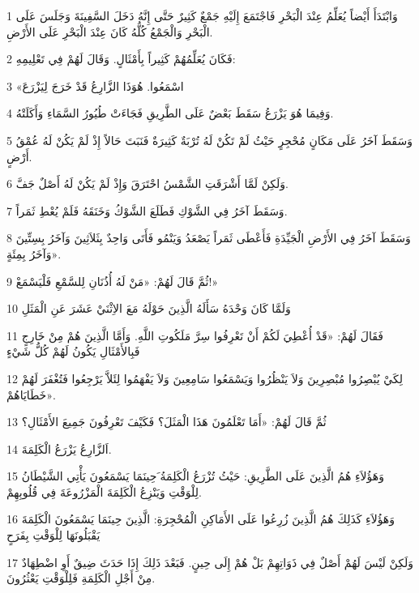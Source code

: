 \par 1 وَابْتَدَأَ أَيْضاً يُعَلِّمُ عِنْدَ الْبَحْرِ فَاجْتَمَعَ إِلَيْهِ جَمْعٌ كَثِيرٌ حَتَّى إِنَّهُ دَخَلَ السَّفِينَةَ وَجَلَسَ عَلَى الْبَحْرِ وَالْجَمْعُ كُلُّهُ كَانَ عِنْدَ الْبَحْرِ عَلَى الأَرْضِ.
\par 2 فَكَانَ يُعَلِّمُهُمْ كَثِيراً بِأَمْثَالٍ. وَقَالَ لَهُمْ فِي تَعْلِيمِهِ:
\par 3 «اسْمَعُوا. هُوَذَا الزَّارِعُ قَدْ خَرَجَ لِيَزْرَعَ
\par 4 وَفِيمَا هُوَ يَزْرَعُ سَقَطَ بَعْضٌ عَلَى الطَّرِيقِ فَجَاءَتْ طُيُورُ السَّمَاءِ وَأَكَلَتْهُ.
\par 5 وَسَقَطَ آخَرُ عَلَى مَكَانٍ مُحْجِرٍ حَيْثُ لَمْ تَكُنْ لَهُ تُرْبَةٌ كَثِيرَةٌ فَنَبَتَ حَالاً إِذْ لَمْ يَكُنْ لَهُ عُمْقُ أَرْضٍ.
\par 6 وَلَكِنْ لَمَّا أَشْرَقَتِ الشَّمْسُ احْتَرَقَ وَإِذْ لَمْ يَكُنْ لَهُ أَصْلٌ جَفَّ.
\par 7 وَسَقَطَ آخَرُ فِي الشَّوْكِ فَطَلَعَ الشَّوْكُ وَخَنَقَهُ فَلَمْ يُعْطِ ثَمَراً.
\par 8 وَسَقَطَ آخَرُ فِي الأَرْضِ الْجَيِّدَةِ فَأَعْطَى ثَمَراً يَصْعَدُ وَيَنْمُو فَأَتَى وَاحِدٌ بِثَلاَثِينَ وَآخَرُ بِسِتِّينَ وَآخَرُ بِمِئَةٍ».
\par 9 ثُمَّ قَالَ لَهُمْ: «مَنْ لَهُ أُذُنَانِ لِلسَّمْعِ فَلْيَسْمَعْ!»
\par 10 وَلَمَّا كَانَ وَحْدَهُ سَأَلَهُ الَّذِينَ حَوْلَهُ مَعَ الاِثْنَيْ عَشَرَ عَنِ الْمَثَلِ
\par 11 فَقَالَ لَهُمْ: «قَدْ أُعْطِيَ لَكُمْ أَنْ تَعْرِفُوا سِرَّ مَلَكُوتِ اللَّهِ. وَأَمَّا الَّذِينَ هُمْ مِنْ خَارِجٍ فَبِالأَمْثَالِ يَكُونُ لَهُمْ كُلُّ شَيْءٍ
\par 12 لِكَيْ يُبْصِرُوا مُبْصِرِينَ وَلاَ يَنْظُرُوا وَيَسْمَعُوا سَامِعِينَ وَلاَ يَفْهَمُوا لِئَلاَّ يَرْجِعُوا فَتُغْفَرَ لَهُمْ خَطَايَاهُمْ».
\par 13 ثُمَّ قَالَ لَهُمْ: «أَمَا تَعْلَمُونَ هَذَا الْمَثَلَ؟ فَكَيْفَ تَعْرِفُونَ جَمِيعَ الأَمْثَالِ؟
\par 14 اَلزَّارِعُ يَزْرَعُ الْكَلِمَةَ.
\par 15 وَهَؤُلاَءِ هُمُ الَّذِينَ عَلَى الطَّرِيقِ: حَيْثُ تُزْرَعُ الْكَلِمَةُ َحِينَمَا يَسْمَعُونَ يَأْتِي الشَّيْطَانُ لِلْوَقْتِ وَيَنْزِعُ الْكَلِمَةَ الْمَزْرُوعَةَ فِي قُلُوبِهِمْ.
\par 16 وَهَؤُلاَءِ كَذَلِكَ هُمُ الَّذِينَ زُرِعُوا عَلَى الأَمَاكِنِ الْمُحْجِرَةِ: الَّذِينَ حِينَمَا يَسْمَعُونَ الْكَلِمَةَ يَقْبَلُونَهَا لِلْوَقْتِ بِفَرَحٍ
\par 17 وَلَكِنْ لَيْسَ لَهُمْ أَصْلٌ فِي ذَوَاتِهِمْ بَلْ هُمْ إِلَى حِينٍ. فَبَعْدَ ذَلِكَ إِذَا حَدَثَ ضِيقٌ أَوِ اضْطِهَادٌ مِنْ أَجْلِ الْكَلِمَةِ فَلِلْوَقْتِ يَعْثُرُونَ.
